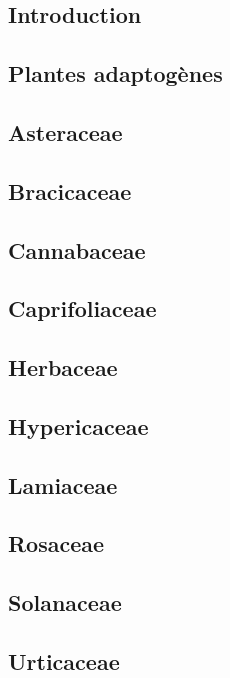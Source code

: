 

\subsection{Introduction}


\subsection{Plantes adaptogènes}

\newpage
\subsection{Asteraceae}

\newpage
\subsection{Bracicaceae}

\newpage
\subsection{Cannabaceae}

\newpage
\subsection{Caprifoliaceae}

\newpage
\subsection{Herbaceae}

\newpage
\subsection{Hypericaceae}

\newpage
\subsection{Lamiaceae}

\newpage
\subsection{Rosaceae}

\newpage
\subsection{Solanaceae}

\newpage
\subsection{Urticaceae}


